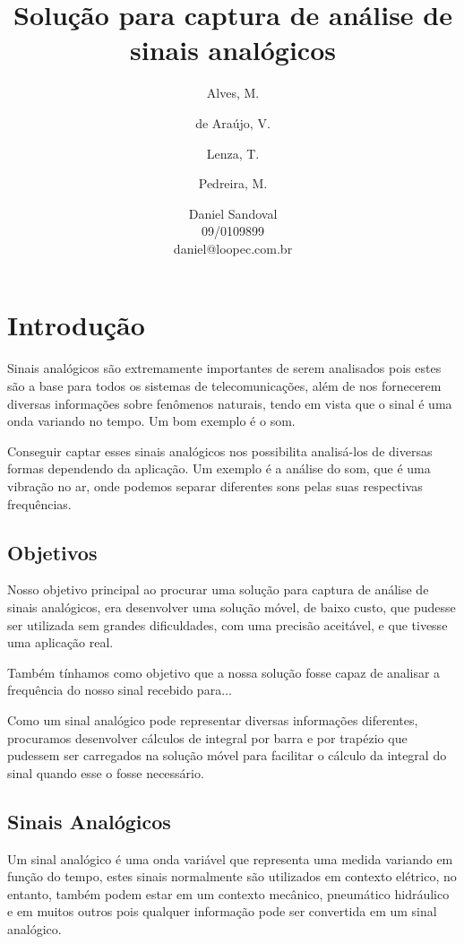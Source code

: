 \documentclass[12pt,a4paper]{report}
\title{Solução para captura de análise de sinais analógicos}
\author{Alves, M.\\
	\and
	de Araújo, V.\\
	\and
	Lenza, T.\\
	\and
	Pedreira, M.\\
	\and
	Daniel Sandoval\\
	09/0109899\\
	daniel@loopec.com.br}
\begin{document}
\maketitle
\tableofcontents

\chapter{Introdução}

Sinais analógicos são extremamente importantes de serem analisados pois estes são a base para todos os sistemas de telecomunicações, além de nos fornecerem diversas informações sobre fenômenos naturais, tendo em vista que o sinal é uma onda variando no tempo. Um bom exemplo é o som.

Conseguir captar esses sinais analógicos nos possibilita analisá-los de diversas formas dependendo da aplicação. Um exemplo é a análise do som, que é uma vibração no ar, onde podemos separar diferentes sons pelas suas respectivas frequências.

\section{Objetivos}

Nosso objetivo principal ao procurar uma solução para captura de análise de sinais analógicos, era desenvolver uma solução móvel, de baixo custo, que pudesse ser utilizada sem grandes dificuldades, com uma precisão aceitável, e que tivesse uma aplicação real.

Também tínhamos como objetivo que a nossa solução fosse capaz de analisar a frequência do nosso sinal recebido para...


Como um sinal analógico pode representar diversas informações diferentes, procuramos desenvolver cálculos de integral por barra e por trapézio que pudessem ser carregados na solução móvel para facilitar o cálculo da integral do sinal quando esse o fosse necessário.

\section{Sinais Analógicos}

Um sinal analógico é uma onda variável que representa uma medida variando em função do tempo, estes sinais normalmente são utilizados em contexto elétrico, no entanto, também podem estar em um contexto mecânico, pneumático hidráulico e em muitos outros pois qualquer informação pode ser convertida em um sinal analógico.
\end{document}
